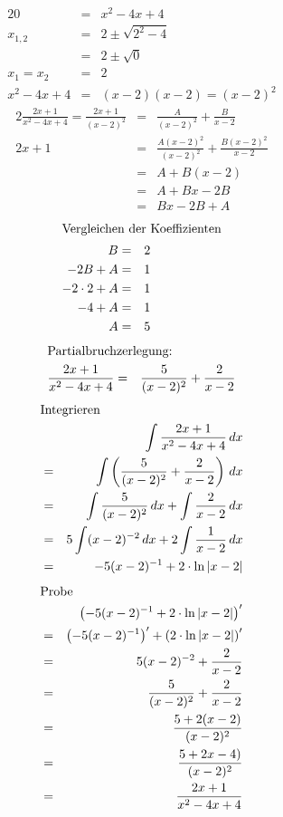 \documentclass[10pt,a4paper,oneside,ngerman,numbers=noenddot]{scrartcl}
\begin{document}
\subsubsection{} %
\begin{alignat*}{2}
0 &=& x^{2} - 4x + 4 \\
x_{1,2} &=& 2 \pm \sqrt{2^{2} - 4} \\
&=& 2 \pm \sqrt{0} \\
x_{1} = x_{2} &=& 2 \\
x^{2} - 4x + 4 &=& (x-2)(x-2) = (x-2)^{2}
\end{alignat*}
\begin{alignat*}{2}
\frac{2x + 1}{x^{2} -4x +4} = \frac{2x + 1}{(x-2)^{2}} &=& \frac{A}{(x-2)^{2}} + \frac{B}{x-2} \\
2x + 1 &=& \frac{A(x-2)^{2}}{(x-2)^{2}} + \frac{B(x-2)^{2}}{x-2} \\
&=& A + B(x-2) \\
&=& A + Bx -2B \\
&=& Bx - 2B + A
\end{alignat*}
\begin{alignat*}{2}
\intertext{Vergleichen der Koeffizienten}
B &=& 2 \\
-2B + A &=& 1 \\
-2 \cdot 2 + A &=& 1 \\
-4 + A &=& 1 \\
A &=& 5
\end{alignat*}
\begin{alignat*}{2}
\intertext{Partialbruchzerlegung:}
\frac{2x+1}{x^{2}-4x+4} &=& \frac{5}{(x-2)^{2}} + \frac{2}{x-2}
\end{alignat*}
\begin{alignat*}{2}
\intertext{Integrieren}
&& \int \frac{2x+1}{x^{2}-4x+4}\,dx \\
&=& \int \left(\frac{5}{(x-2)^{2}} + \frac{2}{x-2}\right)\,dx \\
&=& \int \frac{5}{(x-2)^{2}}\,dx + \int \frac{2}{x-2}\,dx \\
&=& 5 \int (x-2)^{-2}\,dx + 2 \int \frac{1}{x-2}\,dx \\
&=& -5 (x-2)^{-1} + 2 \cdot \ln |x-2|
\end{alignat*}
\begin{alignat*}{2}
\intertext{Probe}
&& \left(-5 (x-2)^{-1} + 2 \cdot \ln |x-2|\right)' \\
&=& \left(-5 (x-2)^{-1}\right)' + \left(2 \cdot \ln |x-2|\right)' \\
&=& 5(x-2)^{-2} + \frac{2}{x-2} \\
&=& \frac{5}{(x-2)^{2}} + \frac{2}{x-2} \\
&=& \frac{5 + 2(x-2)}{(x-2)^{2}} \\
&=& \frac{5 + 2x -4)}{(x-2)^{2}} \\
&=& \frac{2x + 1}{x^{2} -4x +4}
\end{alignat*}
\end{document}
